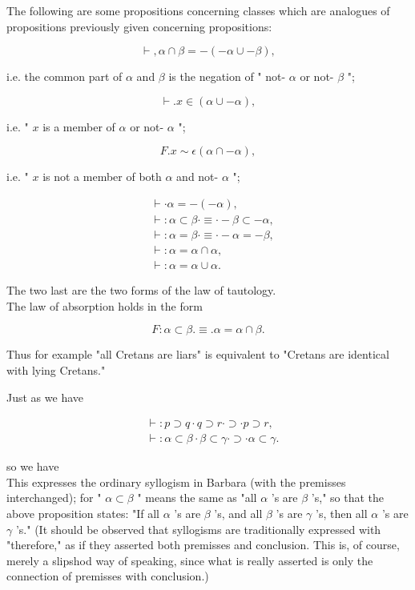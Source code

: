 \documentclass[10pt]{article}
\begin{document}
The following are some propositions concerning classes which are analogues of propositions previously given concerning propositions:

$$
\vdash, \alpha \cap \beta=-(-\alpha \cup-\beta),
$$

i.e. the common part of $\alpha$ and $\beta$ is the negation of " not- $\alpha$ or not- $\beta$ ";

$$
\vdash . x \in(\alpha \cup-\alpha),
$$

i.e. " $x$ is a member of $\alpha$ or not- $\alpha$ ";

$$
F . x \sim \epsilon(\alpha \cap-\alpha),
$$

i.e. " $x$ is not a member of both $\alpha$ and not- $\alpha$ ";

$$
\begin{aligned}
& \vdash \cdot \alpha=-(-\alpha), \\
& \vdash: \alpha \subset \beta \cdot \equiv \cdot-\beta \subset-\alpha, \\
& \vdash: \alpha=\beta \cdot \equiv \cdot-\alpha=-\beta, \\
& \vdash: \alpha=\alpha \cap \alpha, \\
& \vdash: \alpha=\alpha \cup \alpha .
\end{aligned}
$$

The two last are the two forms of the law of tautology.\\
The law of absorption holds in the form

$$
F: \alpha \subset \beta . \equiv . \alpha=\alpha \cap \beta .
$$

Thus for example "all Cretans are liars" is equivalent to "Cretans are identical with lying Cretans."

Just as we have

$$
\begin{aligned}
& \vdash: p \supset q \cdot q \supset r \cdot \supset \cdot p \supset r, \\
& \vdash: \alpha \subset \beta \cdot \beta \subset \gamma \cdot \supset \cdot \alpha \subset \gamma .
\end{aligned}
$$

so we have\\
This expresses the ordinary syllogism in Barbara (with the premisses interchanged); for " $\alpha \subset \beta$ " means the same as "all $\alpha$ 's are $\beta$ 's," so that the above proposition states: "If all $\alpha$ 's are $\beta$ 's, and all $\beta$ 's are $\gamma$ 's, then all $\alpha$ 's are $\gamma$ 's." (It should be observed that syllogisms are traditionally expressed with "therefore," as if they asserted both premisses and conclusion. This is, of course, merely a slipshod way of speaking, since what is really asserted is only the connection of premisses with conclusion.)
\end{document}
